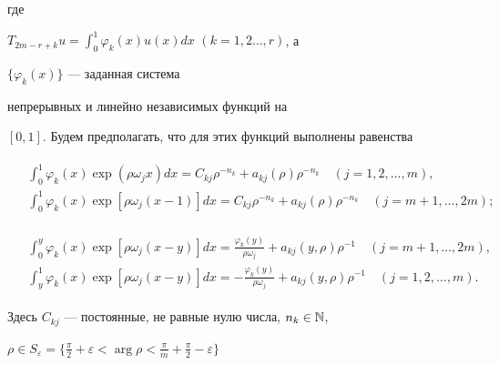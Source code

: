 где 


$T_{2m-r+k}u=\int^1_0\varphi_k(x)u(x)dx$ $(k=1,2\dotsc,r)$, а 


$\{\varphi_k(x)\}$ --- заданная система 


непрерывных и линейно независимых функций на 


$[0,1]$. Будем предполагать, что для этих функций выполнены равенства 


\begin{align} 


\begin{split} 


& \int^1_0\varphi_k(x)\exp(\rho\omega_j x)dx 


=C_{kj}\rho^{-n_k}+a_{kj}(\rho)\rho^{-n_k}\quad (j=1,2,\dotsc,m),\\ 


% 


& \int^1_0\varphi_k(x)\exp[\rho\omega_j(x-1)]dx 


=C_{kj}\rho^{-n_k}+a_{kj}(\rho)\rho^{-n_k}\quad (j=m+1,\dotsc,2m);


\end{split} 


\end{align} 


% 


\begin{align} 


\begin{split} 


& \int^y_0\varphi_k(x)\exp[\rho\omega_j (x-y)]dx 


=\frac{\varphi_k(y)}{\rho\omega_j}+a_{kj}(y,\rho)\rho^{-1} 


\quad (j=m+1,\dotsc,2m),\\ 


% 


& \int^1_y\varphi_k(x)\exp[\rho\omega_j (x-y)]dx 


=-\frac{\varphi_k(y)}{\rho\omega_j}+a_{kj}(y,\rho)\rho^{-1} 


\quad (j=1,2,\dotsc,m).


\end{split}


\end{align}


Здесь $C_{kj}$ --- постоянные, не равные нулю числа, $n_k\in\Bbb N$, 


$\rho\in S_\varepsilon=\{\frac{\pi}{2}+\varepsilon<\arg\rho< 


\frac{\pi}{m}+\frac{\pi}{2}-\varepsilon\}$ 


